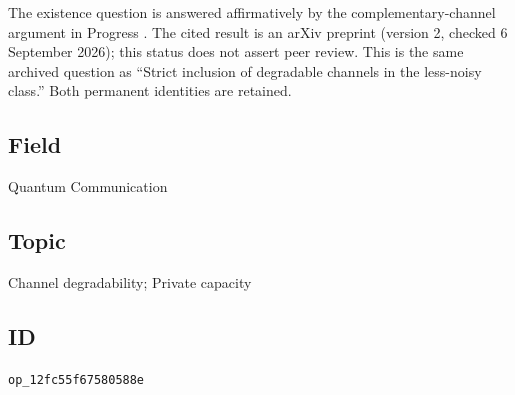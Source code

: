 The existence question is answered affirmatively by the complementary-channel argument in Progress . The cited result is an arXiv preprint (version 2, checked 6 September 2026); this status does not assert peer review. This is the same archived question as ``Strict inclusion of degradable channels in the less-noisy class.'' Both permanent identities are retained.

\subsection*{Field}

Quantum Communication

\subsection*{Topic}

Channel degradability; Private capacity

\subsection*{ID}

\texttt{op\_12fc55f67580588e}
